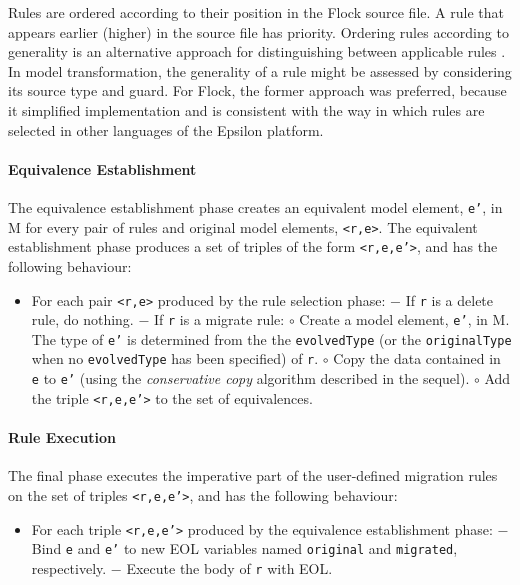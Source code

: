 Rules are ordered according to their position in the Flock source file. A rule that appears earlier (higher) in the source file has priority. Ordering rules according to generality is an alternative approach for distinguishing between applicable rules \cite{wallace05modular}. In model transformation, the generality of a rule might be assessed by considering its source type and guard. For Flock, the former approach was preferred, because it simplified implementation and is consistent with the way in which rules are selected in other languages of the Epsilon platform.

\paragraph{Equivalence Establishment}
The equivalence establishment phase creates an equivalent model element, \texttt{e'}, in M for every pair of rules and original model elements, \texttt{<r,e>}. The equivalent establishment phase produces a set of triples of the form \texttt{<r,e,e'>}, and has the following behaviour:

\begin{itemize}
	\item For each pair \texttt{<r,e>} produced by the rule selection phase:
	\subitem $-$ If \texttt{r} is a delete rule, do nothing.
	\subitem $-$ If \texttt{r} is a migrate rule:
	\subsubitem $\circ$ Create a model element, \texttt{e'}, in M. The type of \texttt{e'} is determined from the the \texttt{evolvedType} (or the \texttt{originalType} when no \texttt{evolvedType} has been specified) of \texttt{r}.
	\subsubitem $\circ$ Copy the data contained in \texttt{e} to \texttt{e'} (using the \emph{conservative copy} algorithm described in the sequel).
	\subsubitem $\circ$ Add the triple \texttt{<r,e,e'>} to the set of equivalences.
\end{itemize}
	
\paragraph{Rule Execution}
The final phase executes the imperative part of the user-defined migration rules on the set of triples \texttt{<r,e,e'>}, and has the following behaviour:

\begin{itemize}
	\item For each triple \texttt{<r,e,e'>} produced by the equivalence establishment phase:
	\subitem $-$ Bind \texttt{e} and \texttt{e'} to new EOL variables named \texttt{or\-ig\-in\-al} and \texttt{mi\-gr\-at\-ed}, respectively.
	\subitem $-$ Execute the body of \texttt{r} with EOL.
\end{itemize}


